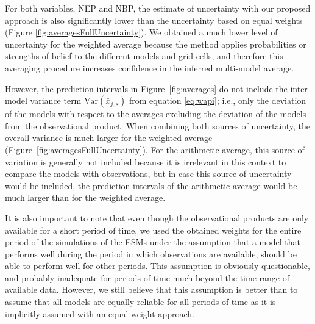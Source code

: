 \documentclass[gmd, manuscript]{copernicus}
\begin{document}
For both variables, NEP and NBP, the estimate of uncertainty with our proposed approach is also significantly lower than the uncertainty based on equal weights (Figure \ref{fig:averagesFullUncertainty}). We obtained a much lower level of uncertainty for the weighted average because the method applies probabilities or strengths of belief to the different models and grid cells, and therefore this averaging procedure increases confidence in the inferred multi-model average. 

However, the prediction intervals in Figure~\ref{fig:averages} do not include the inter-model variance term $ \mathrm{Var}(\bar{x}_{j,s})$ from equation \eqref{eq:wapi}; i.e., only the deviation of the models with respect to the averages excluding the deviation of the models from the observational product. When combining both sources of uncertainty, the overall variance is much larger for the weighted average (Figure~\ref{fig:averagesFullUncertainty}). For the arithmetic average, this source of variation is generally not included because it is irrelevant in this context to compare the models with observations, but in case this source of uncertainty would be included, the prediction intervals of the arithmetic average would be much larger than for the weighted average. 

It is also important to note that even though the observational products are only available for a short period of time, we used the obtained weights for the entire period of the simulations of the ESMs under the assumption that a model that performs well during the period in which observations are available, should be able to perform well for other periods. This assumption is obviously questionable, and probably inadequate for periods of time much beyond the time range of available data. However, we still believe that this assumption is better than to assume that all models are equally reliable for all periods of time as it is implicitly assumed with an equal weight approach. 
\end{document}

